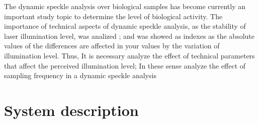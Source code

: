 \documentclass[review]{elsarticle}
\begin{document}
The dynamic speckle analysis over biological samples has become  currently  an important
study topic\cite{catalano2019viability,rivera2019sound,gonzalez2018diode,Silva2018,braga2017dynamic} 
to determine the level of biological activity. 
The importance of technical aspects of dynamic speckle analysis,
as the stability of laser illumination level, was analized \cite{gonzalez2018diode}; 
and was showed as indexes as
the absolute values of the differences \cite{cardoso2014,rivera2017selection} are affected in your values
by the variation of illumination level. Thus, It is necessary analyze the effect
of technical parameters that affect the perceived illumination level; In these sense
analyze the effect of sampling frequency in a dynamic speckle analysis 





\section{System description}
\label{sec:description}
\end{document}
